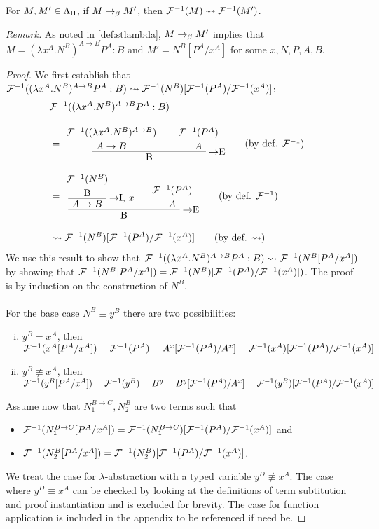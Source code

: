 \begin{proposition}
For $M, M' \in \Lambda_\Pi$, if $M \rightarrow_\beta M'$, then $\mathcal{F}^{-1}(M) \leadsto
\mathcal{F}^{-1}(M')$.
\end{proposition}
\noindent\emph{Remark.}
As noted in \ref{def:stlambda}, $M \rightarrow_\beta M'$ implies that $M = (\lambda
x^A.N^B)^{A \to B}P^A:B$ and $M' = N^B[P^A/x^A]$ for some $x, N, P, A, B$.
\begin{proof}
We first establish that $\mathcal{F}^{-1}((\lambda x^A.N^B)^{A \to B}P^A:B) \leadsto
\mathcal{F}^{-1}(N^B)[\mathcal{F}^{-1}(P^A)/\mathcal{F}^{-1}(x^A)]$:
\begin{align*}
\lefteqn{\chmapanta((\lambda x^A.N^B)^{A \to B}P^A:B)} \\[10pt]
  &= \implelim{%
       \AxiomC{$\chmapanta((\lambda x^A.N^B)^{A \to B})$}
       \noLine
       \UnaryInfC{$A \to B$}
     }{%
       \AxiomC{$\chmapanta(P^A)$}
       \noLine
       \UnaryInfC{$A$}
     }{B}
     \DisplayProof
     \tag{by def. $\chmapanta$} \\[10pt]
  &= \implelim{%
       \implintro{
         \AxiomC{$\chmapanta(N^B)$}
         \noLine
         \UnaryInfC{B}
       }{x}{$A \to B$}
     }{%
       \AxiomC{$\chmapanta(P^A)$}
       \noLine
       \UnaryInfC{$A$}
     }{B}
     \DisplayProof
     \tag{by def. $\chmapanta$} \\[10pt]
  &\leadsto \chmapanta(N^B)[\chmapanta(P^A)/\chmapanta(x^A)]
     \tag{by def. $\leadsto$}
\end{align*}
We use this result to show that $\mathcal{F}^{-1}((\lambda x^A.N^B)^{A \to B}P^A:B)
\leadsto \mathcal{F}^{-1}(N^B[P^A/x^A])$ by showing that
$\mathcal{F}^{-1}(N^B[P^A/x^A]) = \mathcal{F}^{-1}(N^B)[\mathcal{F}^{-1}(P^A)/\mathcal{F}^{-1}(x^A)])$.
The proof is by induction on the construction of $N^B$. \\
\\
For the base case $N^B \equiv y^B$ there are two possibilities:
\begin{enumerate}[(i)]
  \item $y^B = x^A$, then \\
        $\mathcal{F}^{-1}(x^A[P^A/x^A]) = \mathcal{F}^{-1}(P^A) =
        A^x[\mathcal{F}^{-1}(P^A)/A^x] =
        \mathcal{F}^{-1}(x^A)[\mathcal{F}^{-1}(P^A)/\mathcal{F}^{-1}(x^A)]$
  \item $y^B \not\equiv x^A$, then \\
        $\mathcal{F}^{-1}(y^B[P^A/x^A]) = \mathcal{F}^{-1}(y^B) = B^y =
        B^y[\mathcal{F}^{-1}(P^A)/A^x] =
        \mathcal{F}^{-1}(y^B)[\mathcal{F}^{-1}(P^A)/\mathcal{F}^{-1}(x^A)]$
\end{enumerate}
Assume now that $N_1^{B \to C}, N_2^B$ are two terms such that
\begin{itemize}
\item $\mathcal{F}^{-1}(N_1^{B \to C}[P^A/x^A])
      = \mathcal{F}^{-1}(N_1^{B \to C})[\mathcal{F}^{-1}(P^A)/\mathcal{F}^{-1}(x^A)]$ and
\item $\mathcal{F}^{-1}(N_2^B[P^A/x^A]) = \mathcal{F}^{-1}(N_2^B)[\mathcal{F}^{-1}(P^A)/\mathcal{F}^{-1}(x^A)]$.
\end{itemize}
We treat the case for $\lambda$-abstraction with a typed variable $y^D \not\equiv
x^A$. The case where $y^D \equiv x^A$ can be checked by looking at the
definitions of term subtitution and proof instantiation and is excluded for
brevity. The case for function application is included in the appendix to be
referenced if need be.


\end{proof}
